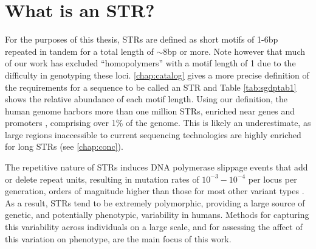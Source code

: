 \section{What is an STR?}%
For the purposes of this thesis, STRs are defined as short motifs of 1-6bp repeated in tandem for a total length of $\sim$8bp or more. Note however that much of our work has excluded ``homopolymers'' with a motif length of 1 due to the difficulty in genotyping these loci. \autoref{chap:catalog} gives a more precise definition of the requirements for a sequence to be called an STR and Table \ref{tab:sgdptab1} shows the relative abundance of each motif length. Using our definition, the human genome harbors more than one million STRs, enriched near genes and promoters \cite{SawayaBagshawBuschiazzoEtAl2013}, comprising over 1\% of the genome. This is likely an underestimate, as large regions inaccessible to current sequencing technologies are highly enriched for long STRs (see \autoref{chap:conc}).

The repetitive nature of STRs induces DNA polymerase slippage events that add or delete repeat units, resulting in mutation rates of $10^{-3}-10^{-4}$ per locus per generation, orders of magnitude higher than those for most other variant types \cite{Ellegren2004,WeberWong1993}. As a result, STRs tend to be extremely polymorphic, providing a large source of genetic, and potentially phenotypic, variability in humans. Methods for capturing this variability across individuals on a large scale, and for assessing the affect of this variation on phenotype, are the main focus of this work.


